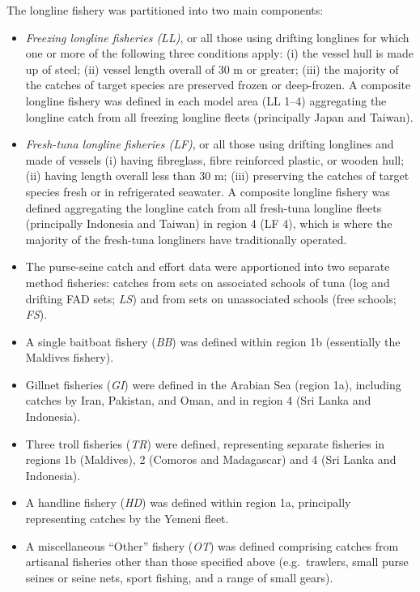 \documentclass[
]{scrartcl}
\begin{document}
The longline fishery was partitioned into two main components:

\begin{itemize}
\item
  \emph{Freezing longline fisheries (LL)}, or all those using drifting
  longlines for which one or more of the following three conditions
  apply: (i) the vessel hull is made up of steel; (ii) vessel length
  overall of 30 m or greater; (iii) the majority of the catches of
  target species are preserved frozen or deep-frozen. A composite
  longline fishery was defined in each model area (LL 1--4) aggregating
  the longline catch from all freezing longline fleets (principally
  Japan and Taiwan).
\item
  \emph{Fresh-tuna longline fisheries (LF)}, or all those using drifting
  longlines and made of vessels (i) having fibreglass, fibre reinforced
  plastic, or wooden hull; (ii) having length overall less than 30 m;
  (iii) preserving the catches of target species fresh or in
  refrigerated seawater. A composite longline fishery was defined
  aggregating the longline catch from all fresh-tuna longline fleets
  (principally Indonesia and Taiwan) in region 4 (LF 4), which is where
  the majority of the fresh-tuna longliners have traditionally operated.
\item
  The purse-seine catch and effort data were apportioned into two
  separate method fisheries: catches from sets on associated schools of
  tuna (log and drifting FAD sets; \emph{LS}) and from sets on
  unassociated schools (free schools; \emph{FS}).
\item
  A single baitboat fishery (\emph{BB}) was defined within region 1b
  (essentially the Maldives fishery).
\item
  Gillnet fisheries (\emph{GI}) were defined in the Arabian Sea (region
  1a), including catches by Iran, Pakistan, and Oman, and in region 4
  (Sri Lanka and Indonesia).
\item
  Three troll fisheries (\emph{TR}) were defined, representing separate
  fisheries in regions 1b (Maldives), 2 (Comoros and Madagascar) and 4
  (Sri Lanka and Indonesia).
\item
  A handline fishery (\emph{HD}) was defined within region 1a,
  principally representing catches by the Yemeni fleet.
\item
  A miscellaneous ``Other'' fishery (\emph{OT}) was defined comprising
  catches from artisanal fisheries other than those specified above
  (e.g.~trawlers, small purse seines or seine nets, sport fishing, and a
  range of small gears).
\end{itemize}
\end{document}
